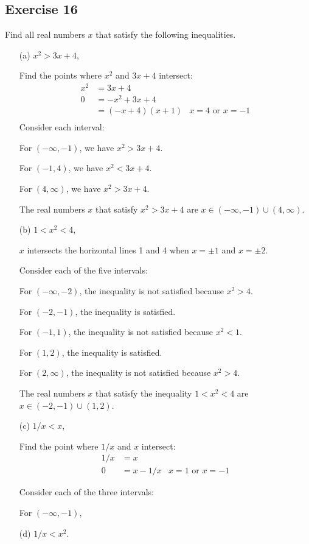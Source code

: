 \documentclass[12pt]{article}
\begin{document}
\subsection*{Exercise 16}
Find all real numbers $x$ that satisfy the following inequalities.
\begin{itemize}
\item[(a)] $x^2 > 3x + 4$,

Find the points where $x^2$ and $3x + 4$ intersect:
\begin{align*}
x^2 &= 3x + 4 \\
0 &= -x^2 + 3x + 4 \\
&= \left(-x + 4\right) \left(x + 1\right) & \text{$x = 4$ or $x = -1$}\\
\end{align*}
Consider each interval:

For $\left(-\infty, -1\right)$, we have $x^2 > 3x+4$.

For $\left(-1, 4\right)$, we have $x^2 < 3x+4$.

For $\left(4, \infty\right)$, we have $x^2 > 3x+4$.

The real numbers $x$ that satisfy $x^2 > 3x + 4$ are $x \in \left(-\infty, -1\right) \cup \left(4, \infty\right)$.
\item[(b)] $1 < x^2 < 4$,

$x$ intersects the horizontal lines 1 and 4 when $x = \pm 1$ and $x = \pm 2$.

Consider each of the five intervals:

For $\left(-\infty, -2\right)$, the inequality is not satisfied because $x^2 > 4$.

For $\left(-2, -1\right)$, the inequality is satisfied.

For $\left(-1, 1\right)$, the inequality is not satisfied because $x^2 < 1$.

For $\left(1, 2\right)$, the inequality is satisfied.

For $\left(2, \infty\right)$, the inequality is not satisfied because $x^2 > 4$.

The real numbers $x$ that satisfy the inequality $1 < x^2 < 4$ are $x \in \left(-2, -1\right) \cup \left(1, 2\right)$.
\item[(c)] $1/x < x$,

Find the point where $1/x$ and $x$ intersect:
\begin{align*}
1/x &= x \\
0 &= x - 1/x & \text{$x = 1$ or $x = -1$}
\end{align*}

Consider each of the three intervals:

For $\left(-\infty, -1\right)$, %
\item[(d)] $1/x < x^2$.
\end{itemize}
\end{document}
